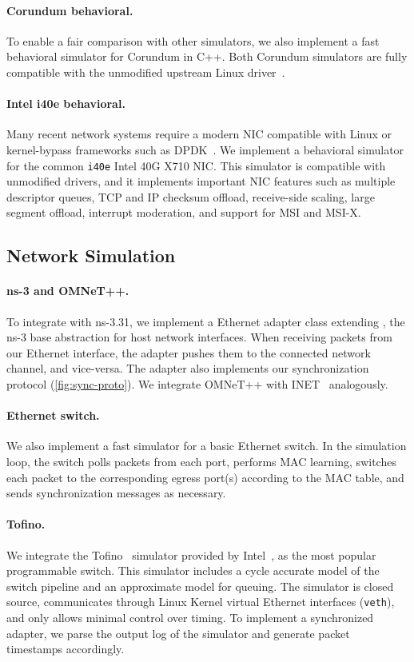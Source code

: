 \paragraph{Corundum behavioral.}
To enable a fair comparison with other simulators, we also
implement a fast behavioral simulator for Corundum in C++.
%
Both Corundum simulators are fully compatible with the unmodified
upstream Linux driver~\cite{corundum_code}.


\paragraph{Intel i40e behavioral.}
Many recent network systems require a modern NIC compatible with
Linux or kernel-bypass frameworks such as DPDK~\cite{software:dpdk}.
%
We implement a behavioral simulator for the common \texttt{i40e} Intel
40G X710 NIC.
%
This simulator is compatible with unmodified drivers, and it implements
important NIC features such as multiple descriptor queues, TCP and IP checksum
offload, receive-side scaling, large segment offload, interrupt moderation, and
support for MSI and MSI-X.


\subsection{Network Simulation}

\paragraph{ns-3 and OMNeT++.}
To integrate with ns-3.31, we implement a \sysname Ethernet adapter
class extending \nd, the ns-3 base abstraction for host network
interfaces.
%
When receiving packets from our Ethernet interface, the adapter pushes them to
the connected network channel, and vice-versa.
%
The adapter also implements our synchronization protocol
(\autoref{fig:sync-proto}).
%
We integrate OMNeT++ with INET~\cite{software:omnetinet} analogously.

\paragraph{Ethernet switch.}
We also implement a fast simulator for a basic Ethernet switch.
%
In the simulation loop, the switch polls packets from each port,
performs MAC learning, switches each packet to the corresponding
egress port(s) according to the MAC table, and sends synchronization
messages as necessary.

\paragraph{Tofino.}
We integrate the Tofino~\cite{product:intel:tofino} simulator provided by
Intel~\cite{software:p4studio}, as the most popular programmable switch.
%
This simulator includes a cycle accurate model of the switch pipeline
and an approximate model for queuing.
%
The simulator is closed source, communicates through Linux Kernel
virtual Ethernet interfaces (\texttt{veth}), and only allows minimal
control over timing.
%
To implement a synchronized adapter, we parse the output log of the
simulator and generate packet timestamps accordingly.

